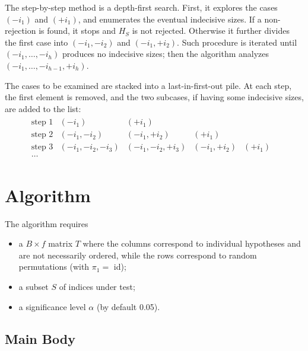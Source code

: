 \documentclass[11pt,a4paper,openright,twoside]{article}
\begin{document}
The step-by-step method is a depth-first search. First, it explores the cases $(-i_1)$ and $(+i_1)$, and enumerates the eventual indecisive sizes. If a non-rejection is found, it stops and $H_S$ is not rejected. Otherwise it further divides the first case into $(-i_1,-i_2)$ and $(-i_1,+i_2)$. Such procedure is iterated until $(-i_1,\ldots,-i_h)$ produces no indecisive sizes; then the algorithm analyzes $(-i_1,\ldots,-i_{h-1},+i_h)$.

The cases to be examined are stacked into a last-in-first-out pile. At each step, the first element is removed, and the two subcases, if having some indecisive sizes, are added to the list:
\begin{align*}
\begin{matrix}
\text{step 1} & (-i_1) & (+i_1) &  &  & \\
\text{step 2} & (-i_1,-i_2) & (-i_1,+i_2) & (+i_1) &  \\
\text{step 3}  &(-i_1,-i_2,-i_3) & (-i_1,-i_2,+i_3) & (-i_1,+i_2) & (+i_1) \\
\ldots &  &  &  &  
\end{matrix}
\end{align*}


















\newpage
\section{Algorithm}
The algorithm requires
\begin{itemize}
\item a $B\times f$ matrix $T$ where the columns correspond to individual hypotheses and are not necessarily ordered, while the rows correspond to random permutations (with $\pi_1=$ id);
\item a subset $S$ of indices under test;
\item a significance level $\alpha$ (by default 0.05).
\end{itemize}



\vspace{5mm}
\subsection{Main Body}
\end{document}
